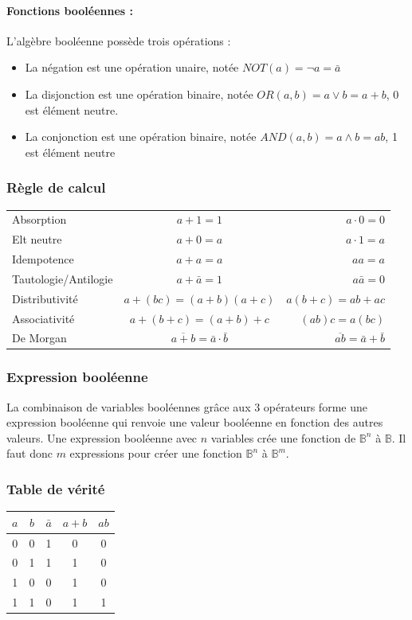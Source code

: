 \documentclass[10pt,a4paper,twoside]{article}
\begin{document}
\paragraph{Fonctions booléennes :} L'algèbre booléenne possède trois opérations :
\begin{itemize}
\item La négation est une opération unaire, notée $NOT(a) = \neg a = \bar{a}$
\item La disjonction est une opération binaire, notée $OR(a,b) = a \vee b = a+b$, 0 est élément neutre.
\item La conjonction est une opération binaire, notée $AND(a,b) = a \wedge b = ab$, 1 est élément neutre
\end{itemize}

\subsubsection{Règle de calcul}
\begin{tabular}{lcr}
Absorption & $a+1=1$ & $a\cdot 0 = 0$ \\ 
Elt neutre & $a+0=a$ & $a\cdot 1 = a$ \\ 
Idempotence & $a+a=a$ & $aa = a$ \\ 
Tautologie/Antilogie & $a+\bar{a}=1$ & $a \bar{a} = 0$ \\ 
Distributivité & $a+(bc) = (a+b)(a+c)$ & $a(b+c) = ab+ac$ \\ 
Associativité & $a+(b+c) = (a+b)+c$ & $(ab)c = a(bc)$ \\ 
De Morgan & $\overline{a+b} = \bar{a} \cdot \bar{b}$ & $\overline{ab} = \bar{a} + \bar{b}$ \\ 
\end{tabular} 

\subsubsection{Expression booléenne}
La combinaison de variables booléennes grâce aux 3 opérateurs forme une expression booléenne qui renvoie une valeur booléenne en fonction des autres valeurs. Une expression booléenne avec $n$ variables crée une fonction de $\mathbb{B}^{n}$ à $\mathbb{B}$. Il faut donc $m$ expressions pour créer une fonction $\mathbb{B}^{n}$ à $\mathbb{B}^{m}$.

\subsubsection{Table de vérité}
\begin{tabular}{c|c||c|c|c}
$a$ & $b$ & $\bar{a}$ & $a+b$ & $ab$ \\ 
\hline 
0 & 0 & 1 & 0 & 0 \\ 
0 & 1 & 1 & 1 & 0 \\ 
1 & 0 & 0 & 1 & 0 \\ 
1 & 1 & 0 & 1 & 1 \\ 
\end{tabular} 
\end{document}
